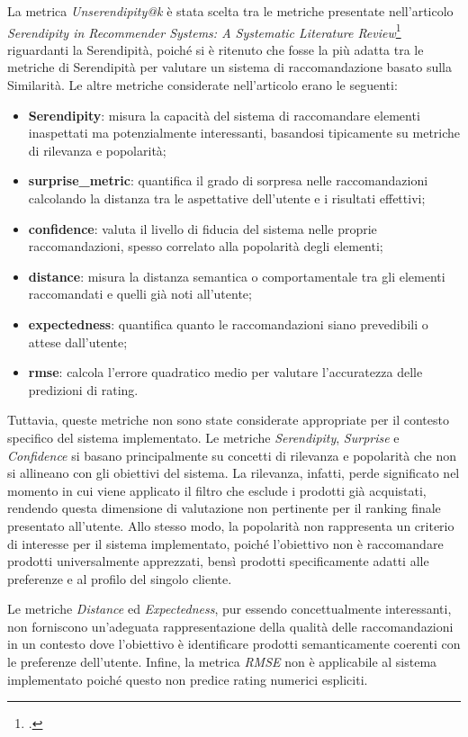 La metrica \emph{Unserendipity@k} è stata scelta tra le metriche presentate nell'articolo \emph{Serendipity in Recommender Systems: A Systematic Literature Review}\footcite{article:serendipity-recommender-systems} riguardanti la Serendipità, poiché si è ritenuto che fosse la più adatta tra le metriche di Serendipità per valutare un sistema di raccomandazione basato sulla Similarità.
Le altre metriche considerate nell'articolo erano le seguenti:
\begin{itemize}
    \item \textbf{Serendipity}: misura la capacità del sistema di raccomandare elementi inaspettati ma potenzialmente interessanti, basandosi tipicamente su metriche di rilevanza e popolarità;
    \item \textbf{\gls{surprise_metric}}: quantifica il grado di sorpresa nelle raccomandazioni calcolando la distanza tra le aspettative dell'utente e i risultati effettivi;
    \item \textbf{\gls{confidence}}: valuta il livello di fiducia del sistema nelle proprie raccomandazioni, spesso correlato alla popolarità degli elementi;
    \item \textbf{\gls{distance}}: misura la distanza semantica o comportamentale tra gli elementi raccomandati e quelli già noti all'utente;
    \item \textbf{\gls{expectedness}}: quantifica quanto le raccomandazioni siano prevedibili o attese dall'utente;
    \item \textbf{\gls{rmse}}: calcola l'errore quadratico medio per valutare l'accuratezza delle predizioni di rating.
\end{itemize}

Tuttavia, queste metriche non sono state considerate appropriate per il contesto specifico del sistema implementato. Le metriche \emph{Serendipity}, \emph{Surprise} e \emph{Confidence} si basano principalmente su concetti di rilevanza e popolarità che non si allineano con gli obiettivi del sistema. La rilevanza, infatti, perde significato nel momento in cui viene applicato il filtro che esclude i prodotti già acquistati, rendendo questa dimensione di valutazione non pertinente per il ranking finale presentato all'utente. Allo stesso modo, la popolarità non rappresenta un criterio di interesse per il sistema implementato, poiché l'obiettivo non è raccomandare prodotti universalmente apprezzati, bensì prodotti specificamente adatti alle preferenze e al profilo del singolo cliente.

Le metriche \emph{Distance} ed \emph{Expectedness}, pur essendo concettualmente interessanti, non forniscono un'adeguata rappresentazione della qualità delle raccomandazioni in un contesto dove l'obiettivo è identificare prodotti semanticamente coerenti con le preferenze dell'utente. Infine, la metrica \emph{RMSE} non è applicabile al sistema implementato poiché questo non predice rating numerici espliciti.

